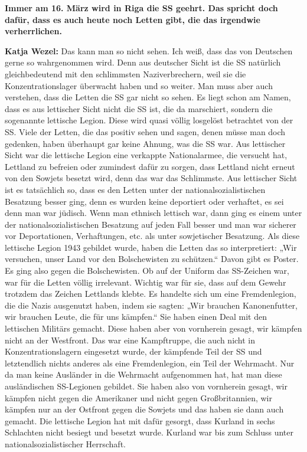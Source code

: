 \textbf{Immer am 16. März wird in Riga die SS geehrt. Das spricht doch dafür, dass es auch heute noch Letten gibt, die das irgendwie verherrlichen.} 

\textbf{Katja Wezel:} Das kann man so nicht sehen. Ich weiß, dass das von Deutschen gerne so wahrgenommen wird. Denn aus deutscher Sicht ist die SS natürlich gleichbedeutend mit den schlimmsten Naziverbrechern, weil sie die Konzentrationslager überwacht haben und so weiter. Man muss aber auch verstehen, dass die Letten die SS gar nicht so sehen. Es liegt schon am Namen, dass es aus lettischer Sicht nicht die SS ist, die da marschiert, sondern die sogenannte lettische Legion. Diese wird quasi völlig losgelöst betrachtet von der SS. Viele der Letten, die das positiv sehen und sagen, denen müsse man doch gedenken, haben überhaupt gar keine Ahnung, was die SS war. Aus lettischer Sicht war die lettische Legion eine verkappte Nationalarmee, die versucht hat, Lettland zu befreien oder zumindest dafür zu sorgen, dass Lettland nicht erneut von den Sowjets besetzt wird, denn das war das Schlimmste. Aus lettischer Sicht ist es tatsächlich so, dass es den Letten unter der nationalsozialistischen Besatzung besser ging, denn es wurden keine deportiert oder verhaftet, es sei denn man war jüdisch. Wenn man ethnisch lettisch war, dann ging es einem unter der nationalsozialistischen Besatzung auf jeden Fall besser und man war sicherer vor Deportationen, Verhaftungen, etc. als unter sowjetischer Besatzung. Als diese lettische Legion 1943 gebildet wurde, haben die Letten das so interpretiert: „Wir versuchen, unser Land vor den Bolschewisten zu schützen.“ Davon gibt es Poster. Es ging also gegen die Bolschewisten. Ob auf der Uniform das SS-Zeichen war, war für die Letten völlig irrelevant. Wichtig war für sie, dass auf dem Gewehr trotzdem das Zeichen Lettlands klebte. Es handelte sich um eine Fremdenlegion, die die Nazis ausgenutzt haben, indem sie sagten: „Wir brauchen Kanonenfutter, wir brauchen Leute, die für uns kämpfen.“ Sie haben einen Deal mit den lettischen Militärs gemacht. Diese haben aber von vornherein gesagt, wir kämpfen nicht an der Westfront. Das war eine Kampftruppe, die auch nicht in Konzentrationslagern eingesetzt wurde, der kämpfende Teil der SS und letztendlich nichts anderes als eine Fremdenlegion, ein Teil der Wehrmacht. Nur da man keine Ausländer in die Wehrmacht aufgenommen hat, hat man diese ausländischen SS-Legionen gebildet. Sie haben also von vornherein gesagt, wir kämpfen nicht gegen die Amerikaner und nicht gegen Großbritannien, wir kämpfen nur an der Ostfront gegen die Sowjets und das haben sie dann auch gemacht. Die lettische Legion hat mit dafür gesorgt, dass Kurland in sechs Schlachten nicht besiegt und besetzt wurde. Kurland war bis zum Schluss unter nationalsozialistischer Herrschaft. 
